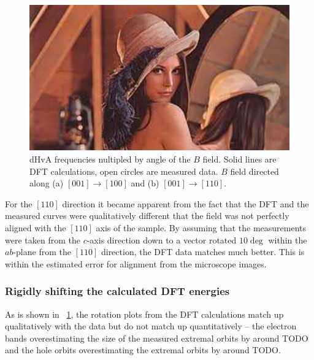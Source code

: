 \begin{figure}[h!]
    \begin{center}
        \includegraphics[scale=0.7]{Misc/TODO}
        \caption{dHvA frequencies nultipled by angle of the $B$ field. Solid lines are DFT calculations, open circles are measured data. $B$ field directed along (a) $[001]\rightarrow[100]$ and (b) $[001]\rightarrow[110]$.}
        \label{Fig:3:ComparisonRotationPlotUnshiftedDFT}
    \end{center}
\end{figure}

For the $[110]$ direction it became apparent from the fact that the DFT and the measured curves were qualitatively different that the field was not perfectly aligned with the $[110]$ axis of the sample. By assuming that the measurements were taken from the $c$-axis direction down to a vector rotated $10\deg$ within the $ab$-plane from the $[110]$ direction, the DFT data matches much better. This is within the estimated error for alignment from the microscope images.


\subsubsection{Rigidly shifting the calculated DFT energies}

As is shown in \fig~\ref{Fig:3:ComparisonRotationPlotUnshiftedDFT}, the rotation plots from the DFT calculations match up qualitatively with the data but do not match up quantitatively -- the electron bands overestimating the size of the measured extremal orbits by around TODO and the hole orbits overestimating the extremal orbits by around TODO. 

